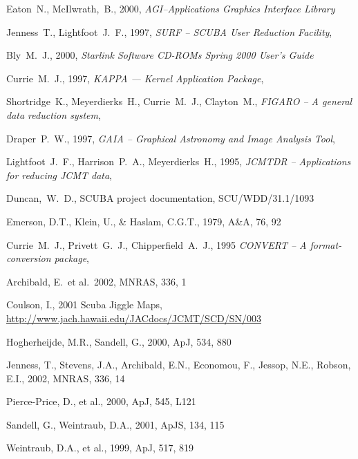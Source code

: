 \documentclass[twoside,11pt,noabs]{starlink}
\begin{document}
\begin{thebibliography}{}

 Eaton~N., McIlwrath,~B., 2000, \textit{AGI--Applications Graphics
Interface Library}

Jenness~T., Lightfoot~J.~F., 1997, \textit{SURF -- SCUBA User
Reduction Facility},


Bly~M.~J., 2000, \textit{Starlink  Software CD-ROMs Spring 2000 User's
Guide}


Currie~M.~J., 1997, \textit{KAPPA --- Kernel Application Package},

Shortridge~K., Meyerdierks~H., Currie~M.~J., Clayton~M.,
\textit{FIGARO -- A general data reduction system},

Draper~P.~W., 1997, \textit{GAIA -- Graphical Astronomy and Image
Analysis Tool},


Lightfoot~J.~F., Harrison~P.~A., Meyerdierks~H., 1995, \textit{JCMTDR
-- Applications for reducing JCMT data}, 


Duncan,~W.~D., SCUBA project documentation, SCU/WDD/31.1/1093

Emerson, D.T., Klein, U., \& Haslam, C.G.T., 1979, A\&A, 76, 92

Currie~M.~J., Privett~G.~J., Chipperfield~A.~J., 1995 \textit{CONVERT --
A format-conversion package}, 

Archibald, E.\ et al.\ 2002, MNRAS, 336, 1

Coulson, I., 2001 { Scuba Jiggle Maps},
\url{http://www.jach.hawaii.edu/JACdocs/JCMT/SCD/SN/003}

Hogherheijde, M.R., Sandell, G., 2000, ApJ, 534, 880

Jenness, T., Stevens, J.A., Archibald, E.N., Economou, F., Jessop,
N.E., Robson, E.I., 2002, MNRAS, 336, 14

Pierce-Price, D., et al., 2000, ApJ, 545, L121

Sandell, G., Weintraub, D.A., 2001, ApJS, 134, 115

Weintraub, D.A., et al., 1999, ApJ, 517, 819


\end{thebibliography}
\end{document}
